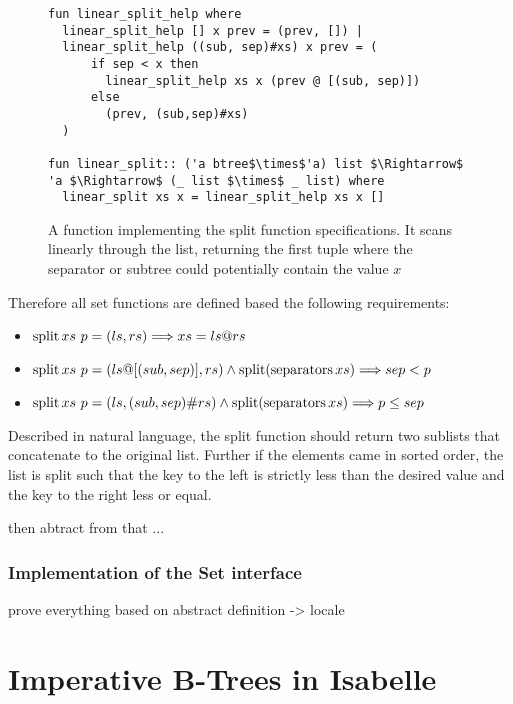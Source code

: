 \begin{figure}
    
\begin{lstlisting}[mathescape=true, language=Isabelle]
fun linear_split_help where
  linear_split_help [] x prev = (prev, []) |
  linear_split_help ((sub, sep)#xs) x prev = (
      if sep < x then
        linear_split_help xs x (prev @ [(sub, sep)])
      else
        (prev, (sub,sep)#xs)
  )

fun linear_split:: ('a btree$\times$'a) list $\Rightarrow$ 'a $\Rightarrow$ (_ list $\times$ _ list) where
  linear_split xs x = linear_split_help xs x []
\end{lstlisting}
\caption{A function implementing the split function specifications.
It scans linearly through the list, returning the first tuple where the separator
or subtree could potentially contain the value $x$}
\label{fig:linear_split}

\end{figure}

Therefore all set functions are defined based the following requirements:

\begin{itemize}
    \item $\operatorname{split} xs\ p = (ls,rs) \Longrightarrow xs = ls @ rs$
    \item $\operatorname{split} xs\ p = (ls@[(sub,sep)],rs) \wedge \operatorname{split} (\operatorname{separators} xs) \Longrightarrow sep < p$
    \item $\operatorname{split} xs\ p = (ls,(sub,sep)\#rs) \wedge \operatorname{split} (\operatorname{separators} xs) \Longrightarrow p \le sep$
\end{itemize}

Described in natural language, the split function should return two sublists
that concatenate to the original list.
Further if the elements came in sorted order,
the list is split such that the key to the left is strictly less than the desired value
and the key to the right less or equal.

then abtract from that ...

\subsection{Implementation of the Set interface}

prove everything based on abstract definition -> locale %


\chapter{Imperative B-Trees in Isabelle}

